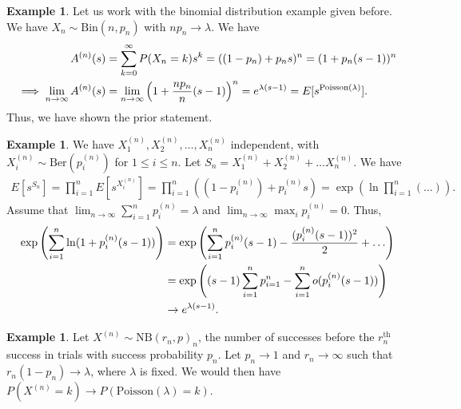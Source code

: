 \documentclass[15pt,a4paper]{book}
\theoremstyle{definition}
\newtheorem{example}[theorem]{Example}
\begin{document}
\begin{example}
    Let us work with the binomial distribution example given before. We have $X_{n} \sim \text{Bin}(n,p_{n})$ with $np_{n} \to \lambda$. We have
    \begin{align}
        A^{(n)}(s) &= \sum_{k=0}^{\infty} P(X_{n} = k) s^{k} = ((1-p_{n}) + p_{n}s)^{n} = (1+p_{n}(s-1))^{n} \notag \\
        \implies \lim_{n \to \infty} A^{(n)}(s) &= \lim_{n \to \infty} \left( 1 + \frac{np_{n}}{n}(s-1) \right)^{n} = e^{\lambda (s-1)} = E[s^{\text{Poisson}(\lambda)}].
    \end{align}
    Thus, we have shown the prior statement.
\end{example}
\begin{example}
    We have $X_{1}^{(n)}, X_{2}^{(n)}, \ldots, X_{n}^{(n)}$ independent, with $X_{i}^{(n)} \sim \text{Ber}(p_{i}^{(n)})$ for $1 \leq i \leq n$. Let $S_{n} = X_{1}^{(n)} + X_{2}^{(n)} + \ldots X_{n}^{(n)}$. We have
    \begin{align}
        E[s^{S_{n}}] = \prod_{i=1}^{n} E[s^{X_{i}^{(n)}}] = \prod_{i=1}^{n} \left( (1-p_{i}^{(n)}) + p_{i}^{(n)} s \right) = \exp \left( \ln \prod_{i=1}^{n} (\ldots) \right).
    \end{align}
    Assume that $\lim_{n \to \infty} \sum_{i=1}^{n} p_{i}^{(n)} = \lambda$ and $\lim_{n \to \infty} \max_{i} p_{i}^{(n)} = 0$. Thus,
    \begin{align}
        \exp \left( \sum_{i=1}^{n} \ln (1 + p_{i}^{(n)} (s-1)) \right) &= \exp \left( \sum_{i=1}^{n} p_{i}^{(n)}(s-1) - \frac{(p_{i}^{(n)}(s-1))^{2}}{2} + \ldots \right) \notag \\
        &= \exp \left( (s-1)\sum_{i=1}^{n} p_{i=1}^{n} - \sum_{i=1}^{n} o(p_{i}^{(n)}(s-1))  \right) \\
        &\to e^{\lambda (s-1)}.
    \end{align}
\end{example}
\begin{example}
    Let $X^{(n)} \sim \text{NB}(r_{n},p)_{n}$, the number of successes before the $r_{n}^{\text{th}}$ success in trials with success probability $p_{n}$. Let $p_{n} \to 1$ and $r_{n} \to \infty$ such that $r_{n}(1-p_{n}) \to \lambda$, where $\lambda$ is fixed. We would then have $P(X^{(n)} = k) \to P(\text{Poisson}(\lambda) = k)$.
\end{example}
\end{document}

